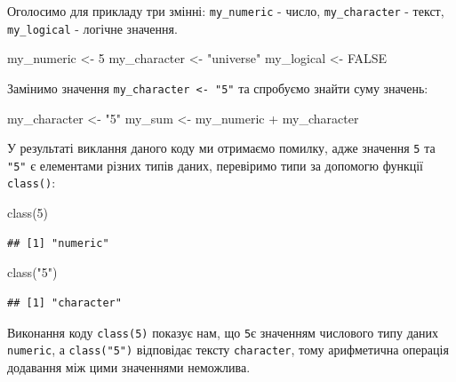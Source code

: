 \documentclass[
]{book}
\newenvironment{Shaded}{\begin{snugshade}}{\end{snugshade}}
\newcommand{\ConstantTok}[1]{\textcolor[rgb]{0.00,0.00,0.00}{#1}}
\newcommand{\DecValTok}[1]{\textcolor[rgb]{0.00,0.00,0.81}{#1}}
\newcommand{\FunctionTok}[1]{\textcolor[rgb]{0.00,0.00,0.00}{#1}}
\newcommand{\NormalTok}[1]{#1}
\newcommand{\OtherTok}[1]{\textcolor[rgb]{0.56,0.35,0.01}{#1}}
\newcommand{\SpecialCharTok}[1]{\textcolor[rgb]{0.00,0.00,0.00}{#1}}
\newcommand{\StringTok}[1]{\textcolor[rgb]{0.31,0.60,0.02}{#1}}
\begin{document}
Оголосимо для прикладу три змінні: \texttt{my\_numeric} - число, \texttt{my\_character} - текст, \texttt{my\_logical} - логічне значення.

\begin{Shaded}
\begin{Highlighting}[]
\NormalTok{my\_numeric }\OtherTok{\textless{}{-}} \DecValTok{5}
\NormalTok{my\_character }\OtherTok{\textless{}{-}} \StringTok{"universe"}
\NormalTok{my\_logical }\OtherTok{\textless{}{-}} \ConstantTok{FALSE}
\end{Highlighting}
\end{Shaded}

Замінимо значення \texttt{my\_character\ \textless{}-\ "5"} та спробуємо знайти суму значень:

\begin{Shaded}
\begin{Highlighting}[]
\NormalTok{my\_character }\OtherTok{\textless{}{-}} \StringTok{"5"}
\NormalTok{my\_sum }\OtherTok{\textless{}{-}}\NormalTok{ my\_numeric }\SpecialCharTok{+}\NormalTok{ my\_character}
\end{Highlighting}
\end{Shaded}

У результаті виклання даного коду ми отримаємо помилку, адже значення \texttt{5} та \texttt{"5"} є елементами різних типів даних, перевіримо типи за допомогю функції \texttt{class()}:

\begin{Shaded}
\begin{Highlighting}[]
\FunctionTok{class}\NormalTok{(}\DecValTok{5}\NormalTok{)}
\end{Highlighting}
\end{Shaded}

\begin{verbatim}
## [1] "numeric"
\end{verbatim}

\begin{Shaded}
\begin{Highlighting}[]
\FunctionTok{class}\NormalTok{(}\StringTok{"5"}\NormalTok{)}
\end{Highlighting}
\end{Shaded}

\begin{verbatim}
## [1] "character"
\end{verbatim}

Виконання коду \texttt{class(5)} показує нам, що \texttt{5}є значенням числового типу даних \texttt{numeric}, а \texttt{class("5")} відповідає тексту \texttt{character}, тому арифметична операція додавання між цими значеннями неможлива.
\end{document}
